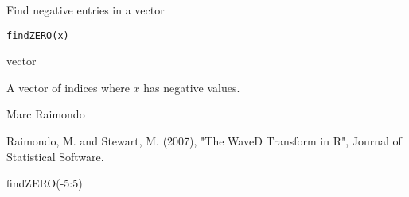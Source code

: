 \documentclass{article}
\begin{document}
\begin{Description}\relax
Find negative entries in a vector
\end{Description}
\begin{Usage}
\begin{verbatim}
findZERO(x)
\end{verbatim}
\end{Usage}
\begin{Arguments}
\begin{ldescription}
\item[\code{x}] vector
\end{ldescription}
\end{Arguments}
\begin{Value}
A vector of indices where $x$
has negative values.
\end{Value}
\begin{Author}\relax
Marc Raimondo
\end{Author}
\begin{References}\relax
Raimondo, M. and Stewart, M. (2007),
"The WaveD Transform in R", Journal of Statistical Software.
\end{References}
\begin{SeeAlso}\relax
{}
\end{SeeAlso}
\begin{Examples}
\begin{ExampleCode}
findZERO(-5:5)
\end{ExampleCode}
\end{Examples}
\end{document}
